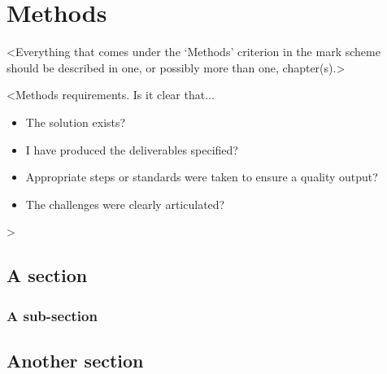 \chapter{Methods}
\label{chapter2}

<Everything that comes under the `Methods' criterion in the mark scheme should be described in one, or possibly more than one, chapter(s).>

<Methods requirements. Is it clear that...
\begin{itemize}
    \item The solution exists?
    \item I have produced the deliverables specified?
    \item Appropriate steps or standards were taken to ensure a quality output?
    \item The challenges were clearly articulated?
\end{itemize}
>

\section{A section}
\lipsum[5]

\subsection{A sub-section}
\lipsum[6]

\section{Another section}
\lipsum[7]
